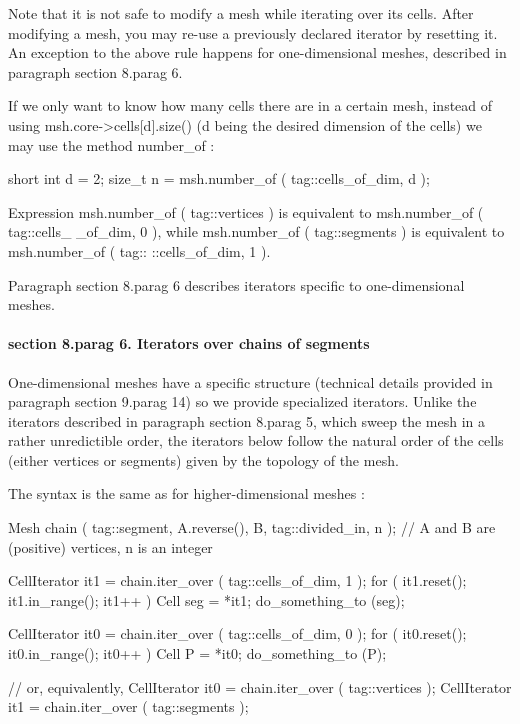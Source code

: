 {Note that it is not safe to modify a mesh while iterating over its cells.
After modifying a mesh, you may re-use a previously declared iterator by {\codett reset}ting it.
An exception to the above rule happens for one-dimensional meshes, described in paragraph
\numb section 8.\numb parag 6.

If we only want to know how many cells there are in a certain mesh,
instead of using {\codett msh.core->cells[d].size()} ({\codett d} being the desired
dimension of the cells) we may use the method {\codett number\_of} :

\verbatim
   short int d = 2;
   size_t n = msh.number_of ( tag::cells_of_dim, d );
\endverbatim

\noindent Expression {\codett msh.number\_of ( tag::vertices )} is equivalent to
{\codett msh.number\_of ( tag::cells\_ \_of\_dim, 0 )}, while {\codett msh.number\_of
( tag::segments ) } is equivalent to {\codett msh.number\_of ( tag:: ::cells\_of\_dim, 1 )}.

Paragraph \numb section 8.\numb parag 6 describes iterators specific to one-dimensional
meshes.


\paragraph{\numb section 8.\numb parag 6. Iterators over chains of segments}

One-dimensional meshes have a specific structure (technical details provided in
paragraph \numb section 9.\numb parag 14) so we provide specialized iterators.
Unlike the iterators described in paragraph \numb section 8.\numb parag 5,
which sweep the mesh in a rather unredictible order,
the iterators below follow the natural order of the cells (either vertices or segments)
given by the topology of the mesh.

The syntax is the same as for higher-dimensional meshes :

\verbatim
   Mesh chain ( tag::segment, A.reverse(), B, tag::divided_in, n );
   // A and B are (positive) vertices, n is an integer
   
   CellIterator it1 = chain.iter_over ( tag::cells_of_dim, 1 );
   for ( it1.reset(); it1.in_range(); it1++ )
   {  Cell seg = *it1;  do_something_to (seg);  }
   
   CellIterator it0 = chain.iter_over ( tag::cells_of_dim, 0 );
   for ( it0.reset(); it0.in_range(); it0++ )
   {  Cell P = *it0;  do_something_to (P);  }

   // or, equivalently,
   CellIterator it0 = chain.iter_over ( tag::vertices );
   CellIterator it1 = chain.iter_over ( tag::segments );
\endverbatim

}
